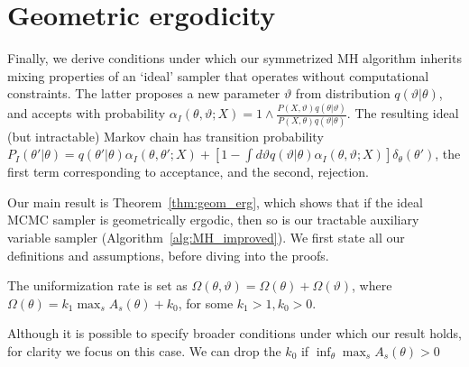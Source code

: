 \vspace{-.1in}
\section{Geometric ergodicity}
\vspace{-.05in}
Finally, we derive conditions under which our symmetrized 
MH algorithm
inherits mixing properties of an `ideal' sampler that operates without
computational constraints. The latter proposes a new parameter $\vartheta$
from distribution $q(\vartheta|\theta)$, and accepts with probability
$\alpha_I(\theta,\vartheta; X) = 1 \wedge \frac{P(X , \vartheta)q(\theta| \vartheta)}
{P(X , \theta)q(\vartheta|\theta)}$.  The resulting ideal (but intractable)
Markov chain has transition probability
$P_I(\theta'|\theta) = q(\theta'|\theta)\alpha_I(\theta,\theta';X) + \left[1-\int d\vartheta
q(\vartheta|\theta)\alpha_I(\theta,\vartheta;X)\right]\delta_\theta(\theta')$, the first
term corresponding to acceptance, and the second, rejection.

Our main result is Theorem~\ref{thm:geom_erg}, which shows that if the ideal MCMC
sampler is geometrically ergodic, then so is our tractable auxiliary
variable sampler (Algorithm~\ref{alg:MH_improved}). 
We first state all our definitions and assumptions, before diving into the 
proofs.
\begin{assumption}
The uniformization rate is set as $\Omega(\theta, \vartheta) = \Omega(\theta) + 
\Omega(\vartheta)$, where %
$\Omega(\theta) = k_1 \max_s A_{s}(\theta) + k_0$, for some 
$k_1 > 1, k_0 > 0$.
\label{asmp:unif_rate}
\end{assumption}
Although it is possible to specify broader conditions under which our 
result holds, for clarity we focus on this case. 
We can drop the $k_0$ if $\inf_\theta \max_s A_s(\theta) > 0$


